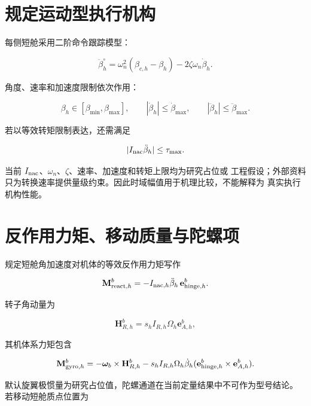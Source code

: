 \documentclass[UTF8,12pt,oneside,openany,fontset=windows]{ctexbook}
\begin{document}
\section{规定运动型执行机构}

每侧短舱采用二阶命令跟踪模型：

\begin{equation}
\ddot\beta_h^\circ=
\omega_n^2(\beta_{c,h}-\beta_h)-2\zeta\omega_n\dot\beta_h.
\end{equation}

角度、速率和加速度限制依次作用：

\begin{equation}
\beta_h\in[\beta_{\min},\beta_{\max}],\qquad
|\dot\beta_h|\le\dot\beta_{\max},\qquad
|\ddot\beta_h|\le\ddot\beta_{\max}.
\end{equation}

若以等效转矩限制表达，还需满足

\begin{equation}
|I_{\rm nac}\ddot\beta_h|\le\tau_{\max}.
\end{equation}

当前 \(I_{\rm nac}\)、\(\omega_n\)、\(\zeta\)、速率、加速度和转矩上限均为研究占位或 工程假设；外部资料只为转换速率提供量级约束。因此时域幅值用于机理比较，不能解释为 真实执行机构性能。

\section{反作用力矩、移动质量与陀螺项}

规定短舱角加速度对机体的等效反作用力矩写作

\begin{equation}
\mathbf M_{{\rm react},h}^b=-I_{{\rm nac},h}\ddot\beta_h\,\mathbf e_{{\rm hinge},h}^b.
\end{equation}

转子角动量为

\begin{equation}
\mathbf H_{R,h}^b=s_h I_{R,h}\Omega_h\mathbf e_{A,h}^b,
\end{equation}

其机体系力矩包含

\begin{equation}
\mathbf M_{{\rm gyro},h}^b=
-\boldsymbol\omega_b\times\mathbf H_{R,h}^b
-s_hI_{R,h}\Omega_h\dot\beta_h
(\mathbf e_{{\rm hinge},h}^b\times\mathbf e_{A,h}^b).
\end{equation}

默认旋翼极惯量为研究占位值，陀螺通道在当前定量结果中不可作为型号结论。 若移动短舱质点位置为
\end{document}
